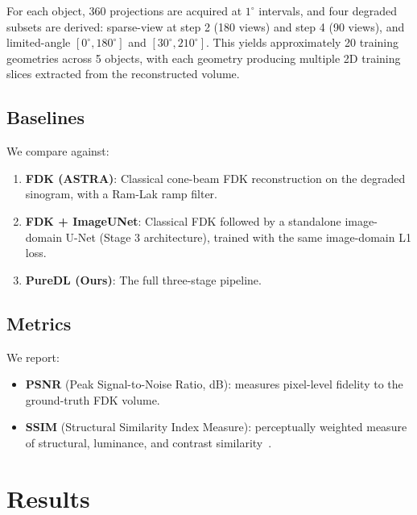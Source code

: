 \documentclass[10pt,twocolumn]{article}
\begin{document}
For each object, 360 projections are acquired at $1^\circ$ intervals,
and four degraded subsets are derived:
sparse-view at step 2 (180 views) and step 4 (90 views),
and limited-angle $[0^\circ, 180^\circ]$ and $[30^\circ, 210^\circ]$.
This yields approximately 20 training geometries across 5 objects,
with each geometry producing multiple 2D training slices extracted
from the reconstructed volume.

\subsection{Baselines}

We compare against:
\begin{enumerate}[leftmargin=*, noitemsep]
    \item \textbf{FDK (ASTRA)}: Classical cone-beam FDK reconstruction
    on the degraded sinogram, with a Ram-Lak ramp filter.
    \item \textbf{FDK + ImageUNet}: Classical FDK followed by a
    standalone image-domain U-Net (Stage 3 architecture), trained
    with the same image-domain L1 loss.
    \item \textbf{PureDL (Ours)}: The full three-stage pipeline.
\end{enumerate}

\subsection{Metrics}

We report:
\begin{itemize}[leftmargin=*, noitemsep]
    \item \textbf{PSNR} (Peak Signal-to-Noise Ratio, dB): measures
    pixel-level fidelity to the ground-truth FDK volume.
    \item \textbf{SSIM} (Structural Similarity Index Measure):
    perceptually weighted measure of structural, luminance, and
    contrast similarity~\cite{wang2004ssim}.
\end{itemize}

\section{Results}
\label{sec:results}
\end{document}
